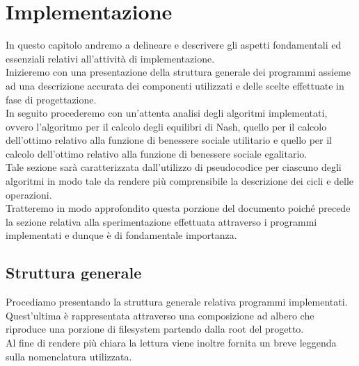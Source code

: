 \chapter{Implementazione}
\justify
In questo capitolo andremo a delineare e descrivere gli aspetti fondamentali ed essenziali relativi all'attività di implementazione.\\

Inizieremo con una presentazione della struttura generale dei programmi assieme ad una descrizione accurata dei componenti utilizzati e delle scelte effettuate in fase di progettazione.\\

In seguito procederemo con un'attenta analisi degli algoritmi implementati, ovvero l'algoritmo per il calcolo degli equilibri di Nash, quello per il calcolo dell'ottimo relativo alla funzione di benessere sociale utilitario e quello per il calcolo dell'ottimo relativo alla funzione di benessere sociale egalitario.\\
Tale sezione sarà caratterizzata dall'utilizzo di pseudocodice per ciascuno degli algoritmi in modo tale da rendere più comprensibile la descrizione dei cicli e delle operazioni.\\

Tratteremo in modo approfondito questa porzione del documento poiché precede la sezione relativa alla sperimentazione effettuata attraverso i programmi implementati e dunque è di fondamentale importanza.\\

\section{Struttura generale}
\justify

Procediamo presentando la struttura generale relativa programmi implementati.\\ 
Quest'ultima è rappresentata attraverso una composizione ad albero che riproduce una porzione di filesystem partendo dalla root del progetto.\\
Al fine di rendere più chiara la lettura viene inoltre fornita un breve leggenda sulla nomenclatura utilizzata.

